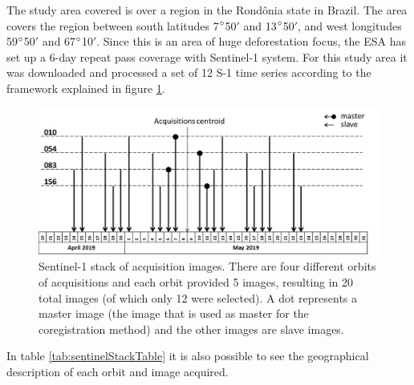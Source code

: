 The study area covered is over a region in the Rondônia state in Brazil. The area covers the region between south latitudes 7$\degree$50$'$ and 13$\degree$50$'$, and west longitudes 59$\degree$50$'$ and 67$\degree$10$'$. Since this is an area of huge deforestation focus, the ESA has set up a 6-day repeat pass coverage with Sentinel-1 system. For this study area it was downloaded and processed a set of 12 S-1 time series according to the framework explained in figure \ref{fig:sentinelStack}.

\begin{figure}[H]
    \centering
    \includegraphics[width=\linewidth]{Cap2-Methods/sentinelstack.jpg}
    \caption{Sentinel-1 stack of acquisition images. There are four different orbits of acquisitions and each orbit provided 5 images, resulting in 20 total images (of which only 12 were selected). A dot represents a master image (the image that is used as master for the coregistration method) and the other images are slave images.}
    \label{fig:sentinelStack}
\end{figure}{}

In table \ref{tab:sentinelStackTable} it is also possible to see the geographical description of each orbit and image acquired.

